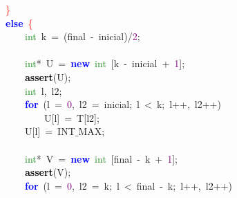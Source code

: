 \mbox{}\ \ \ \ \textcolor{Red}{\}} \\
\mbox{}\ \ \ \ \textbf{\textcolor{Blue}{else}}\ \textcolor{Red}{\{} \\
\mbox{}\ \ \ \ \ \ \ \ \textcolor{ForestGreen}{int}\ k\ \textcolor{BrickRed}{=}\ \textcolor{BrickRed}{(}final\ \textcolor{BrickRed}{-}\ inicial\textcolor{BrickRed}{)/}\textcolor{Purple}{2}\textcolor{BrickRed}{;} \\
\mbox{}\ \ \ \ \ \ \ \  \\
\mbox{}\ \ \ \ \ \ \ \ \textcolor{ForestGreen}{int}\textcolor{BrickRed}{*}\ U\ \textcolor{BrickRed}{=}\ \textbf{\textcolor{Blue}{new}}\ \textcolor{ForestGreen}{int}\ \textcolor{BrickRed}{[}k\ \textcolor{BrickRed}{-}\ inicial\ \textcolor{BrickRed}{+}\ \textcolor{Purple}{1}\textcolor{BrickRed}{];} \\
\mbox{}\ \ \ \ \ \ \ \ \textbf{\textcolor{Black}{assert}}\textcolor{BrickRed}{(}U\textcolor{BrickRed}{);} \\
\mbox{}\ \ \ \ \ \ \ \ \textcolor{ForestGreen}{int}\ l\textcolor{BrickRed}{,}\ l2\textcolor{BrickRed}{;} \\
\mbox{}\ \ \ \ \ \ \ \ \textbf{\textcolor{Blue}{for}}\ \textcolor{BrickRed}{(}l\ \textcolor{BrickRed}{=}\ \textcolor{Purple}{0}\textcolor{BrickRed}{,}\ l2\ \textcolor{BrickRed}{=}\ inicial\textcolor{BrickRed}{;}\ l\ \textcolor{BrickRed}{\textless{}}\ k\textcolor{BrickRed}{;}\ l\textcolor{BrickRed}{++,}\ l2\textcolor{BrickRed}{++)} \\
\mbox{}\ \ \ \ \ \ \ \ \ \ \ \ U\textcolor{BrickRed}{[}l\textcolor{BrickRed}{]}\ \textcolor{BrickRed}{=}\ T\textcolor{BrickRed}{[}l2\textcolor{BrickRed}{];} \\
\mbox{}\ \ \ \ \ \ \ \ U\textcolor{BrickRed}{[}l\textcolor{BrickRed}{]}\ \textcolor{BrickRed}{=}\ INT$\_$MAX\textcolor{BrickRed}{;} \\
\mbox{}\ \ \ \ \ \ \ \  \\
\mbox{}\ \ \ \ \ \ \ \ \textcolor{ForestGreen}{int}\textcolor{BrickRed}{*}\ V\ \textcolor{BrickRed}{=}\ \textbf{\textcolor{Blue}{new}}\ \textcolor{ForestGreen}{int}\ \textcolor{BrickRed}{[}final\ \textcolor{BrickRed}{-}\ k\ \textcolor{BrickRed}{+}\ \textcolor{Purple}{1}\textcolor{BrickRed}{];} \\
\mbox{}\ \ \ \ \ \ \ \ \textbf{\textcolor{Black}{assert}}\textcolor{BrickRed}{(}V\textcolor{BrickRed}{);} \\
\mbox{}\ \ \ \ \ \ \ \ \textbf{\textcolor{Blue}{for}}\ \textcolor{BrickRed}{(}l\ \textcolor{BrickRed}{=}\ \textcolor{Purple}{0}\textcolor{BrickRed}{,}\ l2\ \textcolor{BrickRed}{=}\ k\textcolor{BrickRed}{;}\ l\ \textcolor{BrickRed}{\textless{}}\ final\ \textcolor{BrickRed}{-}\ k\textcolor{BrickRed}{;}\ l\textcolor{BrickRed}{++,}\ l2\textcolor{BrickRed}{++)} \\
